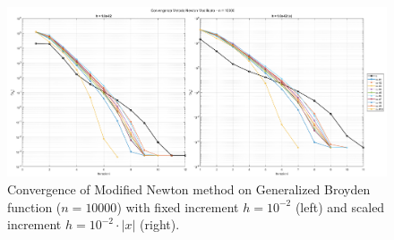 \documentclass[a4paper,12pt]{article}
\begin{document}
	\begin{figure}[htbp]
		\centering
		\includegraphics[width=\textwidth]{../immagini/broyden_10k_h2.png}
		\caption{Convergence of Modified Newton method on Generalized Broyden function ($n=10000$) with fixed increment $h = 10^{-2}$ (left) and scaled increment $h = 10^{-2}\cdot|x|$ (right).}
		\label{fig:fd_broyden_10k_h2}
	\end{figure}
	
\end{document}
